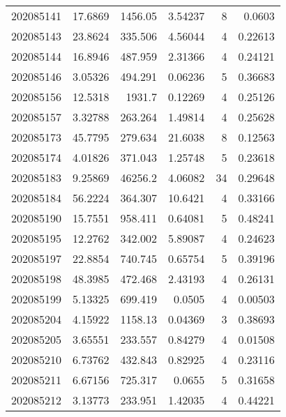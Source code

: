 \begin{tabular}{rrrrrr}
 202085141 &         17.6869  &     1456.05   &            3.54237 &           8 & 0.0603  \\
 202085143 &         23.8624  &      335.506  &            4.56044 &           4 & 0.22613 \\
 202085144 &         16.8946  &      487.959  &            2.31366 &           4 & 0.24121 \\
 202085146 &          3.05326 &      494.291  &            0.06236 &           5 & 0.36683 \\
 202085156 &         12.5318  &     1931.7    &            0.12269 &           4 & 0.25126 \\
 202085157 &          3.32788 &      263.264  &            1.49814 &           4 & 0.25628 \\
 202085173 &         45.7795  &      279.634  &           21.6038  &           8 & 0.12563 \\
 202085174 &          4.01826 &      371.043  &            1.25748 &           5 & 0.23618 \\
 202085183 &          9.25869 &    46256.2    &            4.06082 &          34 & 0.29648 \\
 202085184 &         56.2224  &      364.307  &           10.6421  &           4 & 0.33166 \\
 202085190 &         15.7551  &      958.411  &            0.64081 &           5 & 0.48241 \\
 202085195 &         12.2762  &      342.002  &            5.89087 &           4 & 0.24623 \\
 202085197 &         22.8854  &      740.745  &            0.65754 &           5 & 0.39196 \\
 202085198 &         48.3985  &      472.468  &            2.43193 &           4 & 0.26131 \\
 202085199 &          5.13325 &      699.419  &            0.0505  &           4 & 0.00503 \\
 202085204 &          4.15922 &     1158.13   &            0.04369 &           3 & 0.38693 \\
 202085205 &          3.65551 &      233.557  &            0.84279 &           4 & 0.01508 \\
 202085210 &          6.73762 &      432.843  &            0.82925 &           4 & 0.23116 \\
 202085211 &          6.67156 &      725.317  &            0.0655  &           5 & 0.31658 \\
 202085212 &          3.13773 &      233.951  &            1.42035 &           4 & 0.44221 \\

\end{tabular}
